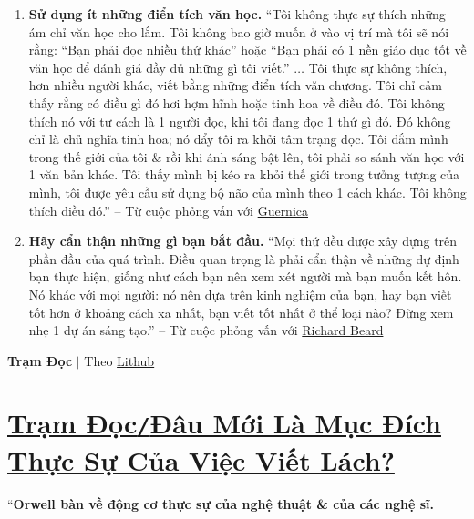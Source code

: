 \documentclass[oneside]{book}
\numberwithin{equation}{section}
\begin{document}
\begin{enumerate}
	\item \textbf{Sử dụng ít những điển tích văn học.} ``Tôi không thực sự thích những ám chỉ văn học cho lắm. Tôi không bao giờ muốn ở vào vị trí mà tôi sẽ nói rằng: ``Bạn phải đọc nhiều thứ khác'' hoặc ``Bạn phải có 1 nền giáo dục tốt về văn học để đánh giá đầy đủ những gì tôi viết.'' $\ldots$ Tôi thực sự không thích, hơn nhiều người khác, viết bằng những điển tích văn chương. Tôi chỉ cảm thấy rằng có điều gì đó hơi hợm hĩnh hoặc tinh hoa về điều đó. Tôi không thích nó với tư cách là 1 người đọc, khi tôi đang đọc 1 thứ gì đó. Đó không chỉ là chủ nghĩa tinh hoa; nó đẩy tôi ra khỏi tâm trạng đọc. Tôi đắm mình trong thế giới của tôi \& rồi khi ánh sáng bật lên, tôi phải so sánh văn học với 1 văn bản khác. Tôi thấy mình bị kéo ra khỏi thế giới trong tưởng tượng của mình, tôi được yêu cầu sử dụng bộ não của mình theo 1 cách khác. Tôi không thích điều đó.'' -- Từ cuộc phỏng vấn với \href{https://www.guernicamag.com/mythic-retreat/}{Guernica}
	\item \textbf{Hãy cẩn thận những gì bạn bắt đầu.} ``Mọi thứ đều được xây dựng trên phần đầu của quá trình. Điều quan trọng là phải cẩn thận về những dự định bạn thực hiện, giống như cách bạn nên xem xét người mà bạn muốn kết hôn. Nó khác với mọi người: nó nên dựa trên kinh nghiệm của bạn, hay bạn viết tốt hơn ở khoảng cách xa nhất, bạn viết tốt nhất ở thể loại nào? Đừng xem nhẹ 1 dự án sáng tạo.'' -- Từ cuộc phỏng vấn với \href{https://holdenlee.wordpress.com/2014/02/18/kazuo-ishiguro-on-writing/}{Richard Beard}
\end{enumerate}

\begin{flushright}
	\textbf{Trạm Đọc} $|$ Theo \href{https://lithub.com/kazuo-ishiguro-write-what-you-know-is-the-stupidest-thing-ive-ever-heard/}{Lithub}
\end{flushright}

\section{\href{http://www.tramdoc.vn/tin-tuc/dau-moi-la-muc-dich-thuc-su-cua-viec-viet-lach-nnOqWW.html}{Trạm Đọc\texttt{/}Đâu Mới Là Mục Đích Thực Sự Của Việc Viết Lách?}}
``\textbf{Orwell bàn về động cơ thực sự của nghệ thuật \& của các nghệ sĩ.}
\end{document}
